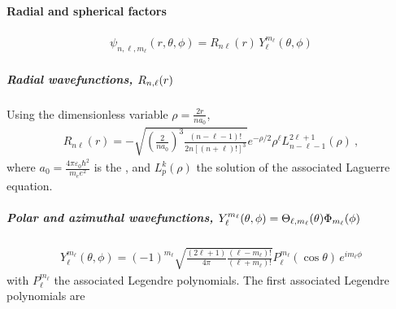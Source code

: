 \documentclass[letterpaper,10pt,english]{jupyterBook}
\begin{document}
\paragraph{Radial and spherical factors}
\label{\detokenize{ch/quantum-mechanics/atom-models/schrodinger-gallery:radial-and-spherical-factors}}\label{\detokenize{ch/quantum-mechanics/atom-models/schrodinger-gallery:quantum-mechanics-atom-models-schrodinger-gallery-r-spherical}}\begin{equation*}
\begin{split}\psi_{n,\ell,m_\ell}(r, \theta, \phi) = R_{n\ell}(r) \, Y_\ell^{m_\ell}(\theta, \phi)\end{split}
\end{equation*}

\subparagraph{Radial wavefunctions, \protect\(R_{n, \ell}(r)\protect\)}
\label{\detokenize{ch/quantum-mechanics/atom-models/schrodinger-gallery:radial-wavefunctions-r-n-ell-r}}\label{\detokenize{ch/quantum-mechanics/atom-models/schrodinger-gallery:quantum-mechanics-atom-models-schrodinger-gallery-r-spherical-r}}
\sphinxAtStartPar
{} Using the dimensionless variable \(\rho = \frac{2r}{n a_0}\),
\begin{equation*}
\begin{split}R_{n\ell}(r) = -\sqrt{\left(\frac{2}{n a_0}\right)^3 \frac{(n-\ell-1)!}{2n [(n+\ell)!]^3}} e^{-\rho/2} \rho^\ell L_{n-\ell-1}^{2\ell+1}(\rho) \ ,\end{split}
\end{equation*}
\sphinxAtStartPar
where \(a_0 = \frac{4\pi \varepsilon_0 \hbar^2}{m_e e^2}\) is the , and \(L^k_p(\rho)\) the solution of the associated Laguerre equation.


\subparagraph{Polar and azimuthal wavefunctions, \protect\(Y^{m_\ell}_{\ell}(\theta,\phi) = \Theta_{\ell, m_\ell}(\theta) \Phi_{m_\ell}(\phi)\protect\)}
\label{\detokenize{ch/quantum-mechanics/atom-models/schrodinger-gallery:polar-and-azimuthal-wavefunctions-y-m-ell-ell-theta-phi-theta-ell-m-ell-theta-phi-m-ell-phi}}\label{\detokenize{ch/quantum-mechanics/atom-models/schrodinger-gallery:quantum-mechanics-atom-models-schrodinger-gallery-r-spherical-spherical}}\begin{equation*}
\begin{split}Y_\ell^{m_\ell}(\theta, \phi) = (-1)^{m_\ell} \sqrt{\frac{(2\ell+1)}{4\pi} \frac{(\ell-m_\ell)!}{(\ell+m_\ell)!}} P_\ell^{m_\ell}(\cos\theta) \, e^{i m_\ell \phi}\end{split}
\end{equation*}
\sphinxAtStartPar
with \(P^{m_{\ell}}_{\ell}\) the associated Legendre polynomials. The first associated Legendre polynomials are
\end{document}
